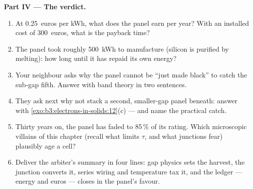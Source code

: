 \begin{problem}
\medskip\noindent\textbf{Part IV --- The verdict.}

\begin{enumerate}[resume]
  \item At \qty{0.25}{euros} per kWh, what does the panel earn
        per year? With an installed cost of \qty{300}{euros},
        what is the payback time?
  \item The panel took roughly \qty{500}{kWh} to manufacture
        (silicon is purified by melting): how long until it has
        repaid its own energy?
  \item Your neighbour asks why the panel cannot be
        ``just made black'' to catch the sub-gap fifth. Answer
        with band theory in two sentences.
  \item They ask next why not stack a second, smaller-gap panel
        beneath: answer with
        \cref{exo:b3:electrons-in-solids:12}(c) --- and name the
        practical catch.
  \item Thirty years on, the panel has faded to 85\,\% of its
        rating. Which microscopic villains of this chapter
        (recall what limits $\tau$, and what junctions fear)
        plausibly age a cell?
  \item Deliver the arbiter's summary in four lines: gap physics
        sets the harvest, the junction converts it, series
        wiring and temperature tax it, and the ledger --- energy
        and euros --- closes in the panel's favour.
\end{enumerate}
\end{problem}
